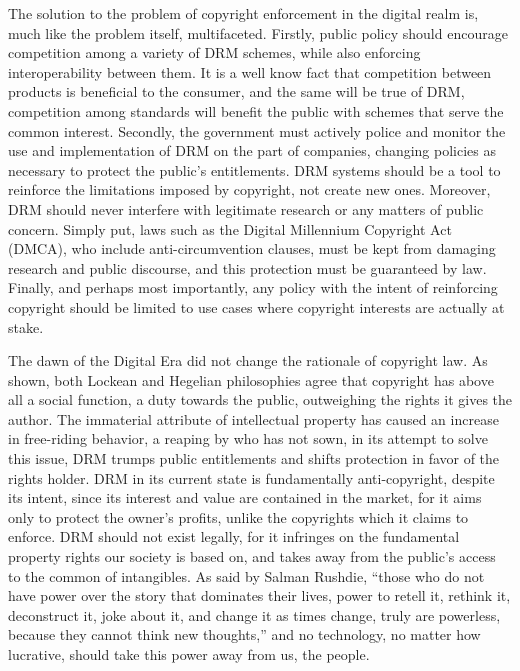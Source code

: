 \documentclass[12pt,letterpaper]{article}
\begin{document}
The solution to the problem of copyright enforcement in the digital realm is, much like the problem itself, multifaceted. Firstly, public policy should encourage competition among a variety of DRM schemes, while also enforcing interoperability between them. It is a well know fact that competition between products is beneficial to the consumer, and the same will be true of DRM, competition among standards will benefit the public with schemes that serve the common interest. Secondly, the government must actively police and monitor the use and implementation of DRM on the part of companies, changing policies as necessary to protect the public's entitlements. DRM systems should be a tool to reinforce the limitations imposed by copyright, not create new ones. Moreover, DRM should never interfere with legitimate research or any matters of public concern. Simply put, laws such as the Digital Millennium Copyright Act (DMCA), who include anti-circumvention clauses, must be kept from damaging research and public discourse, and this protection must be guaranteed by law. Finally, and perhaps most importantly, any policy with the intent of reinforcing copyright should be limited to use cases where copyright interests are actually at stake\autocite{felten-2005}.

The dawn of the Digital Era did not change the rationale of copyright law. As shown, both Lockean and Hegelian philosophies agree that copyright has above all a social function, a duty towards the public, outweighing the rights it gives the author. The immaterial attribute of intellectual property has caused an increase in free-riding behavior, a reaping by who has not sown, in its attempt to solve this issue, DRM trumps public entitlements and shifts protection in favor of the rights holder. DRM in its current state is fundamentally anti-copyright, despite its intent, since its interest and value are contained in the market, for it aims only to protect the owner's profits, unlike the copyrights which it claims to enforce. DRM should not exist legally, for it infringes on the fundamental property rights our society is based on, and takes away from the public's access to the common of intangibles. As said by Salman Rushdie, ``those who do not have power over the story that dominates their lives, power to retell it, rethink it, deconstruct it, joke about it, and change it as times change, truly are powerless, because they cannot think new thoughts,''\autocite{rushdie-1991} and no technology, no matter how lucrative, should take this power away from us, the people.

\newpage
\singlespace
\printbibliography[heading=bibintoc,title={Bibliography}]
\end{document}
